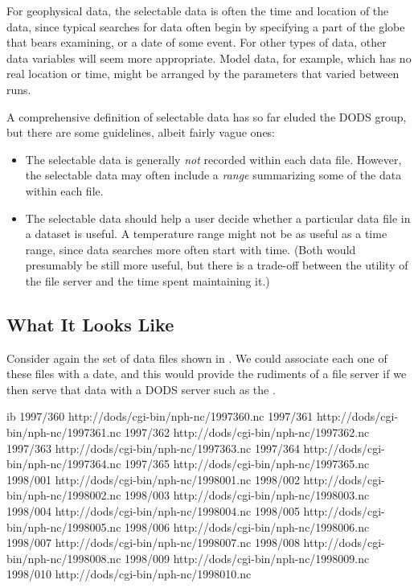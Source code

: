 For geophysical data, the selectable data is often the time and
location of the data, since typical searches for data often begin by
specifying a part of the globe that bears examining, or a date of some
event.  For other types of data, other data variables will seem more
appropriate.  Model data, for example, which has no real location or
time, might be arranged by the parameters that varied between runs.

A comprehensive definition of selectable data has so far eluded the
DODS group, but there are some guidelines, albeit fairly vague ones:

\begin{itemize}
\item The selectable data is generally \emph{not} recorded within each
  data file.  However, the selectable data may often include a
  \emph{range} summarizing some of the data within each file.
\item The selectable data should help a user decide whether a
  particular data file in a dataset is useful.  A temperature range
  might not be as useful as a time range, since data searches more
  often start with time.  (Both would presumably be still more useful,
  but there is a trade-off between the utility of the file server and
  the time spent maintaining it.)
\end{itemize}

\subsection{What It Looks Like}
\label{fs,look}

Consider again the set of data files shown in .
We could associate each one of these files with a date, and this would
provide the rudiments of a file server if we then serve that data with
a DODS server such as the \ffs .


\begin{vcode}{ib}
1997/360 http://dods/cgi-bin/nph-nc/1997360.nc
1997/361 http://dods/cgi-bin/nph-nc/1997361.nc
1997/362 http://dods/cgi-bin/nph-nc/1997362.nc
1997/363 http://dods/cgi-bin/nph-nc/1997363.nc
1997/364 http://dods/cgi-bin/nph-nc/1997364.nc
1997/365 http://dods/cgi-bin/nph-nc/1997365.nc
1998/001 http://dods/cgi-bin/nph-nc/1998001.nc
1998/002 http://dods/cgi-bin/nph-nc/1998002.nc
1998/003 http://dods/cgi-bin/nph-nc/1998003.nc
1998/004 http://dods/cgi-bin/nph-nc/1998004.nc
1998/005 http://dods/cgi-bin/nph-nc/1998005.nc
1998/006 http://dods/cgi-bin/nph-nc/1998006.nc
1998/007 http://dods/cgi-bin/nph-nc/1998007.nc
1998/008 http://dods/cgi-bin/nph-nc/1998008.nc
1998/009 http://dods/cgi-bin/nph-nc/1998009.nc
1998/010 http://dods/cgi-bin/nph-nc/1998010.nc
\end{vcode}

